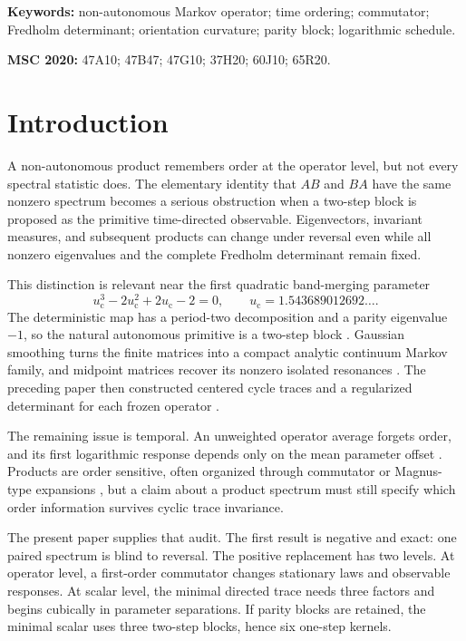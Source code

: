 \documentclass[11pt]{article}
\theoremstyle{definition}
\theoremstyle{remark}
\newcommand{\uc}{u_{\mathrm c}}
\begin{document}
\noindent\textbf{Keywords:} non-autonomous Markov operator; time ordering;
commutator; Fredholm determinant; orientation curvature; parity block;
logarithmic schedule.

\medskip
\noindent\textbf{MSC 2020:} 47A10; 47B47; 47G10; 37H20; 60J10; 65R20.

\section{Introduction}

A non-autonomous product remembers order at the operator level, but not every
spectral statistic does.  The elementary identity that $AB$ and $BA$ have the
same nonzero spectrum becomes a serious obstruction when a two-step block is
proposed as the primitive time-directed observable.  Eigenvectors, invariant
measures, and subsequent products can change under reversal even while all
nonzero eigenvalues and the complete Fredholm determinant remain fixed.

This distinction is relevant near the first quadratic band-merging parameter
\begin{equation}\label{eq:uc}
 \uc^3-2\uc^2+2\uc-2=0,
 \qquad \uc=1.543689012692\ldots.
\end{equation}
The deterministic map has a period-two decomposition and a parity eigenvalue
$-1$, so the natural autonomous primitive is a two-step block
\citep{WangParity2026}.  Gaussian smoothing turns the finite matrices into a
compact analytic continuum Markov family, and midpoint matrices recover its
nonzero isolated resonances \citep{WangGaussianResponse2026,WangContinuum2026}.
The preceding paper then constructed centered cycle traces and a regularized
determinant for each frozen operator \citep{WangCycleSpectrum2026}.

The remaining issue is temporal.  An unweighted operator average forgets
order, and its first logarithmic response depends only on the mean parameter
offset \citep{WangObstructions2026}.  Products are order sensitive, often
organized through commutator or Magnus-type expansions
\citep{BlanesEtAl2009}, but a claim about a product spectrum must still specify
which order information survives cyclic trace invariance.

The present paper supplies that audit.  The first result is negative and
exact: one paired spectrum is blind to reversal.  The positive replacement
has two levels.  At operator level, a first-order commutator changes
stationary laws and observable responses.  At scalar level, the minimal
directed trace needs three factors and begins cubically in parameter
separations.  If parity blocks are retained, the minimal scalar uses three
two-step blocks, hence six one-step kernels.
\end{document}

